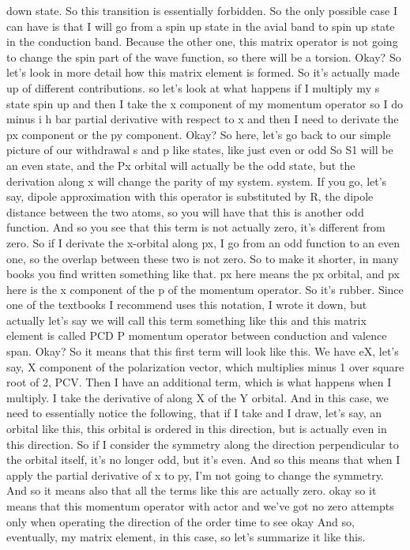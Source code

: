 down state. So this transition is essentially forbidden. So the only possible case I can have is that I will go from a spin up state in the avial band to spin up state in the conduction band. Because the other one, this matrix operator is not going to change the spin part of the wave function, so there will be a torsion. Okay? So let's look in more detail how this matrix element is formed. So it's actually made up of different contributions. so let's look at what happens if I multiply my s state spin up and then I take the x component of my momentum operator so I do minus i h bar partial derivative with respect to x and then I need to derivate the px component or the py component. Okay? So here, let's go back to our simple picture of our withdrawal s and p like states, like just even or odd So S1 will be an even state, and the Px orbital will actually be the odd state, but the derivation along x will change the parity of my system. system. If you go, let's say, dipole approximation with this operator is substituted by R, the dipole distance between the two atoms, so you will have that this is another odd function. And so you see that this term is not actually zero, it's different from zero. So if I derivate the x-orbital along px, I go from an odd function to an even one, so the overlap between these two is not zero. So to make it shorter, in many books you find written something like that. px here means the px orbital, and px here is the x component of the p of the momentum operator. So it's rubber. Since one of the textbooks I recommend uses this notation, I wrote it down, but actually let's say we will call this term something like this and this matrix element is called PCD P momentum operator between conduction and valence span. Okay? So it means that this first term will look like this. We have eX, let's say, X component of the polarization vector, which multiplies minus 1 over square root of 2, PCV. Then I have an additional term, which is what happens when I multiply. I take the derivative of along X of the Y orbital. And in this case, we need to essentially notice the following, that if I take and I draw, let's say, an orbital like this, this orbital is ordered in this direction, but is actually even in this direction. So if I consider the symmetry along the direction perpendicular to the orbital itself, it's no longer odd, but it's even. And so this means that when I apply the partial derivative of x to py, I'm not going to change the symmetry. And so it means also that all the terms like this are actually zero. okay so it means that this momentum operator with actor and we've got no zero attempts only when operating the direction of the order time to see okay And so, eventually, my matrix element, in this case, so let's summarize it like this.
